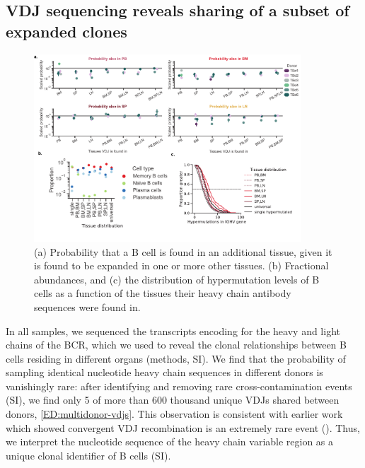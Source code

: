 \subsection{VDJ sequencing reveals sharing of a subset of expanded clones}
\begin{figure}
    \centering
    \includegraphics[width=10cm, keepaspectratio]{figs/Tabula_Bursa/Figure3_revised.pdf}
    \caption[Characteristics of clonally expanded B cells.]{ (a) Probability that a B cell is found in an additional tissue, given it is found to be expanded in one or more other tissues. (b) Fractional abundances, and (c) the distribution of hypermutation levels of B cells as a function of the tissues their heavy chain antibody sequences were found in.}
    \label{fig:clonally-expanded-B-cells}
\end{figure}
 In all samples, we sequenced the transcripts encoding for the heavy and light chains of the BCR, which we used to reveal the clonal relationships between B cells residing in different organs (methods, SI). We find that the probability of sampling identical nucleotide heavy chain sequences in different donors is vanishingly rare: after identifying and removing rare cross-contamination events (SI), we find only 5 of more than 600 thousand unique VDJs shared between donors, \ref{ED:multidonor-vdjs}. This observation is consistent with earlier work which showed convergent VDJ recombination is an extremely rare event (\cite{mora2019many, briney2019commonality}). Thus, we interpret the nucleotide sequence of the heavy chain variable region as a unique clonal identifier of B cells (SI). 
 
